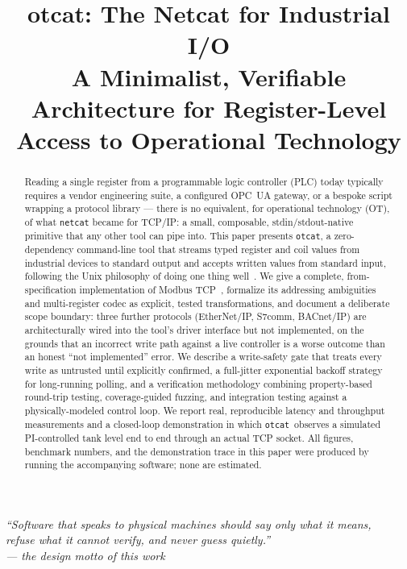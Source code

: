 \documentclass[10pt,conference]{IEEEtran}
\title{\textbf{otcat}: The Netcat for Industrial I/O\\
\large A Minimalist, Verifiable Architecture for Register-Level Access to Operational Technology}
\author{
\IEEEauthorblockN{Moustafa Mahmoud Atta}
\IEEEauthorblockA{QuitOperation \\ v1.0.0 --- July 2026 \\
Email: MoustafaAt1a@outlook.com \\ GitHub: \url{https://github.com/MoustafaAt1a} \\
Project: \url{https://github.com/QuitOperation/otcat}}
}
\newcommand{\otcat}{\texttt{otcat}}
\newcommand{\code}[1]{\texttt{#1}}
\begin{document}
\maketitle

\begin{center}
\begin{minipage}{0.92\linewidth}
\centering
\itshape\small
``Software that speaks to physical machines should say only what it means,\\
refuse what it cannot verify, and never guess quietly.''
\normalfont\\[2pt]
\upshape\footnotesize --- the design motto of this work
\end{minipage}
\end{center}
\vspace{4pt}

\begin{abstract}
Reading a single register from a programmable logic controller (PLC)
today typically requires a vendor engineering suite, a configured OPC~UA
gateway, or a bespoke script wrapping a protocol library --- there is no
equivalent, for operational technology (OT), of what \code{netcat}
became for TCP/IP: a small, composable, stdin/stdout-native primitive
that any other tool can pipe into. This paper presents \otcat, a
zero-dependency command-line tool that streams typed register and coil
values from industrial devices to standard output and accepts written
values from standard input, following the Unix philosophy of doing one
thing well~\cite{mcilroy1978}. We give a complete, from-specification
implementation of Modbus TCP~\cite{modbus2012,modbus_tcp_guide}, formalize
its addressing ambiguities and multi-register codec as explicit,
tested transformations, and document a deliberate scope boundary: three
further protocols (EtherNet/IP, S7comm, BACnet/IP) are architecturally
wired into the tool's driver interface but not implemented, on the
grounds that an incorrect write path against a live controller is a
worse outcome than an honest ``not implemented'' error. We describe a
write-safety gate that treats every write as untrusted until explicitly
confirmed, a full-jitter exponential backoff strategy~\cite{brooker2015}
for long-running polling, and a verification methodology combining
property-based round-trip testing, coverage-guided fuzzing, and
integration testing against a physically-modeled control loop. We
report real, reproducible latency and throughput measurements and a
closed-loop demonstration in which \otcat\ observes a simulated
PI-controlled tank level end to end through an actual TCP socket. All
figures, benchmark numbers, and the demonstration trace in this paper
were produced by running the accompanying software; none are estimated.
\end{abstract}
\end{document}
